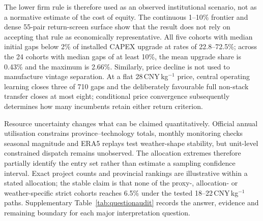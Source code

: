 \documentclass[pdflatex,sn-nature]{sn-jnl}
\begin{document}
The lower firm rule is therefore used as an observed institutional scenario, not as a normative estimate of the cost of equity. The continuous 1--10\% frontier and dense 55-pair return-screen surface show that the result does not rely on accepting that rule as economically representative. All five cohorts with median initial gaps below 2\% of installed CAPEX upgrade at rates of 22.8--72.5\%; across the 24 cohorts with median gaps of at least 10\%, the mean upgrade share is 0.43\% and the maximum is 2.66\%. Similarly, price decline is not used to manufacture vintage separation. At a flat 28\,CNY\,kg$^{-1}$ price, central operating learning closes three of 710 gaps and the deliberately favourable full non-stack transfer closes at most eight; conditional price convergence subsequently determines how many incumbents retain either return criterion.

Resource uncertainty changes what can be claimed quantitatively. Official annual utilisation constrains province--technology totals, monthly monitoring checks seasonal magnitude and ERA5 replays test weather-shape stability, but unit-level constrained dispatch remains unobserved. The allocation extremes therefore partially identify the entry set rather than estimate a sampling confidence interval. Exact project counts and provincial rankings are illustrative within a stated allocation; the stable claim is that none of the proxy-, allocation- or weather-specific strict cohorts reaches 6.5\% under the tested 18--22\,CNY\,kg$^{-1}$ paths. Supplementary Table~\ref{tab:questionaudit} records the answer, evidence and remaining boundary for each major interpretation question.
\end{document}
